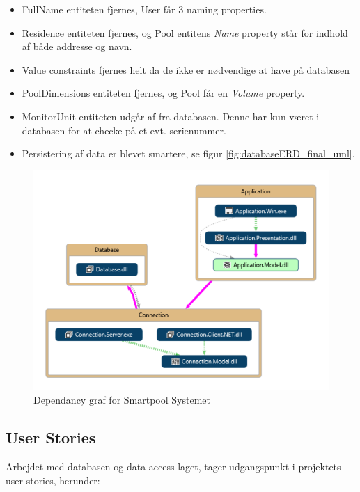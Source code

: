 \begin{itemize}
	\item FullName entiteten fjernes, User får 3 naming properties.
	\item Residence entiteten fjernes, og Pool entitens \textit{Name} property står for indhold af både addresse og navn.
	\item Value constraints fjernes helt da de ikke er nødvendige at have på databasen
	\item PoolDimensions entiteten fjernes, og Pool får en \textit{Volume} property.
	\item MonitorUnit entiteten udgår af fra databasen. Denne har kun været i databasen for at checke på et evt. serienummer.
	\item Persistering af data er blevet smartere, se figur \ref{fig:databaseERD_final_uml}.
\end{itemize}

\begin{figure}[h]
	\centering
	\includegraphics[width=0.8\linewidth]{figs/design/vs_codeMap.PNG}
	\caption{Dependancy graf for Smartpool Systemet}
	\label{fig:vs_codeMap}
\end{figure}

\subsection{User Stories}
Arbejdet med databasen og data access laget, tager udgangspunkt i projektets user stories, herunder:


